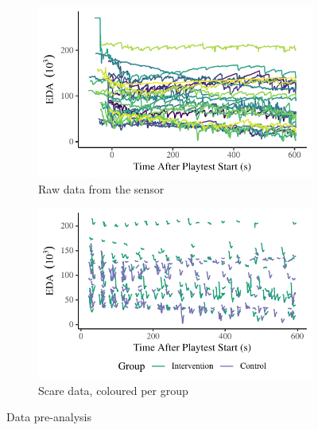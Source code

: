 \documentclass[12pt,a4paper]{article}\usepackage[]{graphicx}\usepackage[]{color}
\makeatletter
\def\maxwidth{ %
  \ifdim\Gin@nat@width>\linewidth
    \linewidth
  \else
    \Gin@nat@width
  \fi
}
\makeatother
\begin{document}
\begin{figure}[htb]
	\centering
	\begin{subfigure}[t]{.49\linewidth}


{\centering \includegraphics[width=\maxwidth]{figure/RawData-1} 

}



		\caption{Raw data from the sensor}
		\label{fig:RawData}
	\end{subfigure}
	\begin{subfigure}[t]{.49\linewidth}


{\centering \includegraphics[width=\maxwidth]{figure/PerGroupScares-1} 

}



		\caption{Scare data, coloured per group}
		\label{fig:PerGroupScares}
	\end{subfigure}
	\caption{Data pre-analysis}
	\label{fig:Data}
\end{figure}
\end{document}
